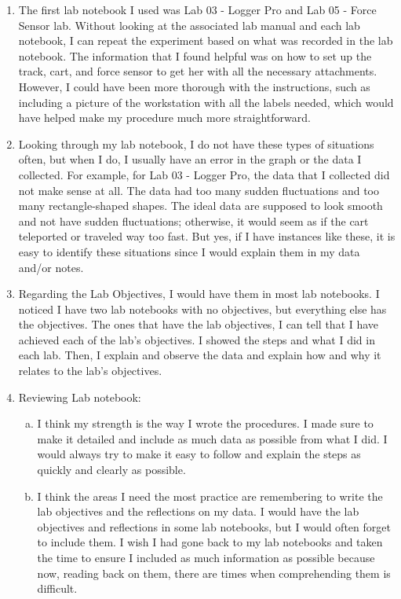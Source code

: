 \documentclass[idxtotoc,hyperref,openany]{labbook} %
\begin{document}
\begin{enumerate}
    \item The first lab notebook I used was Lab 03 - Logger Pro and Lab 05 - Force Sensor lab. Without looking at the associated lab manual and each lab notebook, I can repeat the experiment based on what was recorded in the lab notebook. The information that I found helpful was on how to set up the track, cart, and force sensor to get her with all the necessary attachments. However, I could have been more thorough with the instructions, such as including a picture of the workstation with all the labels needed, which would have helped make my procedure much more straightforward.
    \item Looking through my lab notebook, I do not have these types of situations often, but when I do, I usually have an error in the graph or the data I collected. For example, for Lab 03 - Logger Pro, the data that I collected did not make sense at all. The data had too many sudden fluctuations and too many rectangle-shaped shapes. The ideal data are supposed to look smooth and not have sudden fluctuations; otherwise, it would seem as if the cart teleported or traveled way too fast. But yes, if I have instances like these, it is easy to identify these situations since I would explain them in my data and/or notes.
    \item Regarding the Lab Objectives, I would have them in most lab notebooks. I noticed I have two lab notebooks with no objectives, but everything else has the objectives. The ones that have the lab objectives, I can tell that I have achieved each of the lab's objectives. I showed the steps and what I did in each lab. Then, I explain and observe the data and explain how and why it relates to the lab's objectives.
    \item Reviewing Lab notebook:
    \begin{enumerate}[(a)]
        \item I think my strength is the way I wrote the procedures. I made sure to make it detailed and include as much data as possible from what I did. I would always try to make it easy to follow and explain the steps as quickly and clearly as possible.
        \item I think the areas I need the most practice are remembering to write the lab objectives and the reflections on my data. I would have the lab objectives and reflections in some lab notebooks, but I would often forget to include them. I wish I had gone back to my lab notebooks and taken the time to ensure I included as much information as possible because now, reading back on them, there are times when comprehending them is difficult.

\end{enumerate}
\end{enumerate}
\end{document}
